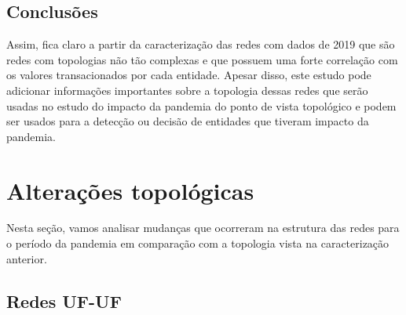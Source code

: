 \subsection{Conclusões}
\label{section:metricas-redes:conclusoes}

Assim, fica claro a partir da caracterização das redes com dados de 2019 que são redes com topologias não tão complexas e que possuem uma forte correlação com os valores transacionados por cada entidade. Apesar disso, este estudo pode adicionar informações importantes sobre a topologia dessas redes que serão usadas no estudo do impacto da pandemia do ponto de vista topológico e podem ser usados para a detecção ou decisão de entidades que tiveram impacto da pandemia.

\section{Alterações topológicas}
\label{section:alteracoes-topologicas}

Nesta seção, vamos analisar mudanças que ocorreram na estrutura das redes para o período da pandemia em comparação com a topologia vista na caracterização anterior.

\subsection{Redes UF-UF}
\label{section:alteracoes-topologicas:uf}

